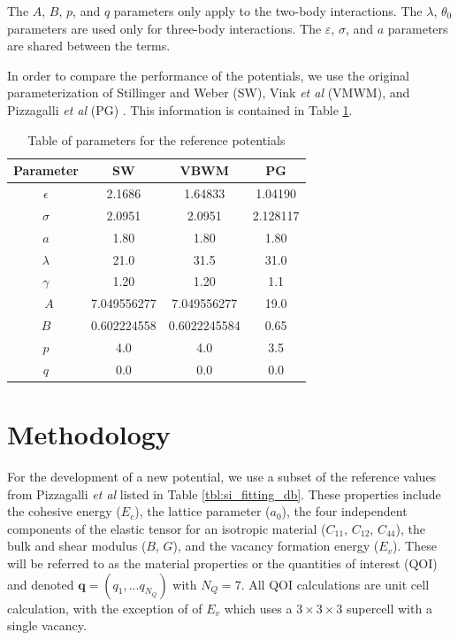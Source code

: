 The $A$, $B$, $p$, and $q$ parameters only apply to the two-body interactions.
The $\lambda$, $\theta_0$ parameters are used only for three-body interactions.
The $\varepsilon$, $\sigma$, and $a$ parameters are shared between the terms.

In order to compare the performance of the potentials, we use the original parameterization of Stillinger and Weber (SW)\cite{stillinger1985_sw}, Vink \emph{et al} (VMWM)\cite{vink2001_sw_Si}, and Pizzagalli \emph{et al} (PG) \cite{pizzagalli2013_sw_Si}.  This information is contained in Table \ref{tbl:sw_parameters_ref}.

\begin{table}[ht]
	\centering
	\caption{Table of parameters for the reference potentials}
	\label{tbl:sw_parameters_ref}
	\begin{tabular}{c c c c}
		\hline
		Parameter & SW & VBWM & PG \\
		\hline
		$\epsilon$ & 2.1686 & 1.64833 & 1.04190 \\
		$\sigma$ &   2.0951 & 2.0951 & 2.128117 \\
		$a$ &       1.80 & 1.80 & 1.80 \\
		$\lambda$ & 21.0 & 31.5 & 31.0 \\
		$\gamma$ & 1.20 & 1.20 & 1.1 \\\
		$A$ & 7.049556277 & 7.049556277 & 19.0 \\
		$B$ & 0.602224558 & 0.6022245584 & 0.65 \\
		$p$ & 4.0 & 4.0 & 3.5 \\
		$q$ & 0.0 & 0.0 & 0.0 \\
		\hline
	\end{tabular}
\end{table}

\section{Methodology}

For the development of a new potential, we use a subset of the reference values from Pizzagalli \emph{et al} \cite{pizzagalli2013_sw_Si} listed in Table \ref{tbl:si_fitting_db}.  These properties include the cohesive energy ($E_c$), the lattice parameter ($a_0$), the four independent components of the elastic tensor for an isotropic material ($C_{11}$, $C_{12}$, $C_{44}$), the bulk and shear modulus ($B$, $G$), and the vacancy formation energy ($E_v$).
These will be referred to as the material properties or the quantities of interest (QOI) and denoted $\bm{q}=(q_1,...q_{N_Q})$ with $N_Q = 7$.
All QOI calculations are unit cell calculation, with the exception of of $E_v$ which uses a $3 \times 3 \times 3$ supercell with a single vacancy.

